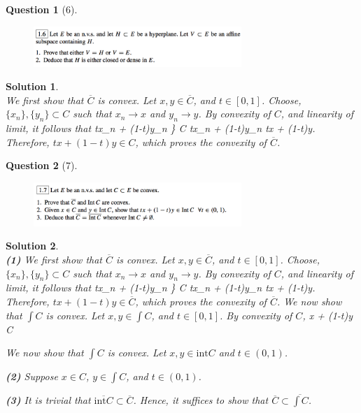 \documentclass{article} %
\def\eQb#1\eQe{\begin{eqnarray*}#1\end{eqnarray*}}
\theoremstyle{quest}
\newtheorem*{question}{Question}
\newtheorem*{solution}{Solution}
\begin{document}
\begin{question}[6]
\hfill
\begin{figure}[h!]
  \centering
    \includegraphics[width=0.7\textwidth]{funcA-1-6.png}
\end{figure}
\end{question}
\begin{solution} \hfill \\
We first show that $\overline{C}$ is convex. Let $x,y \in \overline{C}$, and
$t \in [0,1]$. Choose, $\{x_n\}, \{y_n\} \subset C$ such that $x_n \to x$ and
$y_n \to y$. By convexity of $C$, and linearity of limit, it follows that 
\eQb
\{ tx_n + (1-t)y_n \} \subset C \>\>  \>\> 
tx_n + (1-t)y_n \to tx + (1-t)y.
\eQe
Therefore, $tx + (1-t)y \in C$, which proves the convexity of $\overline{C}$.
\end{solution}

\newpage

\begin{question}[7]
\hfill
\begin{figure}[h!]
  \centering
    \includegraphics[width=0.7\textwidth]{funcA-1-7.png}
\end{figure}
\end{question}
\begin{solution} \hfill \\
\textbf{(1)}
We first show that $\overline{C}$ is convex. Let $x,y \in \overline{C}$, and
$t \in [0,1]$. Choose, $\{x_n\}, \{y_n\} \subset C$ such that $x_n \to x$ and
$y_n \to y$. By convexity of $C$, and linearity of limit, it follows that 
\eQb
\{ tx_n + (1-t)y_n \} \subset C \>\>  \>\> 
tx_n + (1-t)y_n \to tx + (1-t)y.
\eQe
Therefore, $tx + (1-t)y \in \overline{C}$, 
which proves the convexity of $\overline{C}$. We now show that $\int C$ is
convex. Let $x,y \in \int {C}$, and $t \in [0,1]$. By convexity of $C$, 
\eQb
tx + (1-t)y \in C 
\eQe 


\bigskip
We now show that $\int C$ is convex. Let $x,y \in \text{int}{C}$ and $t \in (0,1)$. 



\textbf{(2)} Suppose $x \in C$, $y \in \int C$, and $t \in (0,1)$.  

\bigskip

\textbf{(3)} It is trivial that $\overline{\text{int} C} \subset \overline{C}$. Hence,
it suffices to show that $\overline{C} \subset \overline{\int C}$. 


\end{solution}
\end{document}
